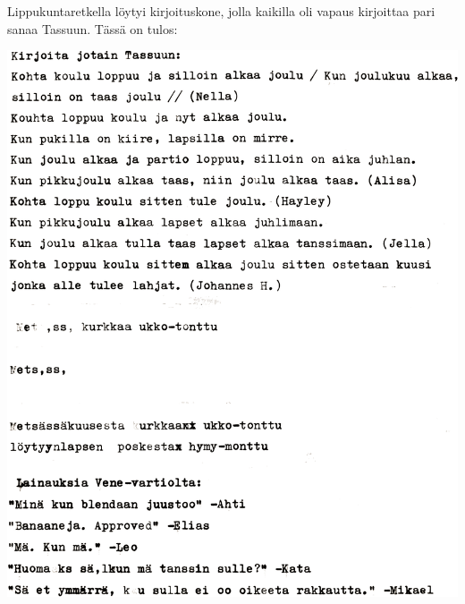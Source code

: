 \clearpage
\noindent Lippukuntaretkella löytyi kirjoituskone, jolla kaikilla oli vapaus
kirjoittaa pari sanaa Tassuun. Tässä on tulos:

\vspace*{1.5cm}
\noindent\includegraphics[width=\linewidth]{assets/pikkujoulu2}
